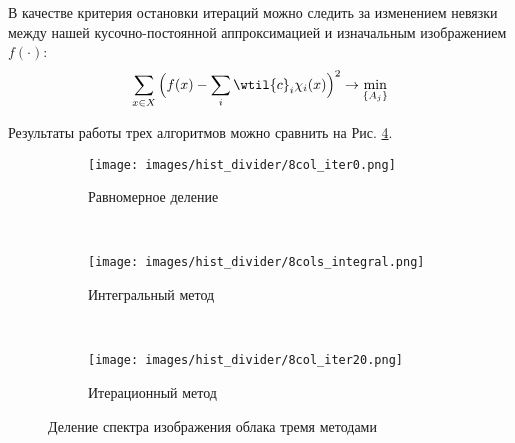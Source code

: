 В качестве критерия остановки итераций можно следить за изменением невязки между нашей кусочно-постоянной аппроксимацией и изначальным изображением $f(\cdot)$:
$$
    \sum_{x \in X} \Big( f(x) - \sum_{i} \wtil{c}_i \chi_i(x) \Big)^2 \rightarrow \min_{\{A_j\}}
$$

Результаты работы трех алгоритмов можно сравнить на Рис. \ref{fig:hist_divider}.

\begin{figure}[H]
\begin{subfigure}{\linewidth}
  \centering
  \texttt{[image: images/hist\_divider/8col\_iter0.png]}
  \caption{Равномерное деление}
  \label{fig:uniform_div}
\end{subfigure}
\\
\begin{subfigure}{\linewidth}
  \centering
  \texttt{[image: images/hist\_divider/8cols\_integral.png]}
  \caption{Интегральный метод}
  \label{fig:integral_div}
\end{subfigure}
\\
\begin{subfigure}{\linewidth}
  \centering
  \texttt{[image: images/hist\_divider/8col\_iter20.png]}
  \caption{Итерационный метод}
  \label{fig:iterative_div}
\end{subfigure}
\caption{Деление спектра изображения облака тремя методами}
\label{fig:hist_divider}
\end{figure}